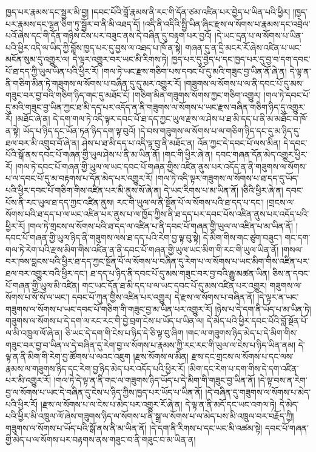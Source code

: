 ཁྱད་པར་རྣམས་དང་སྦྱར་མི་བྱ། །དབང་པོའི་བློ་རྣམས་ནི་རང་གི་དོན་ཙམ་འཛིན་པར་བྱེད་པ་ཡིན་པའི་ཕྱིར། །ཁྱད་པར་རྣམས་དང་ལྷན་ཅིག་ཏུ་སྦྱོར་བ་ནི་མི་འཐད་དོ། །འདི་ནི་འདིའི་སྤྱི་ཡིན་ཞིང་རྫས་ལ་སོགས་པ་རྣམས་དང་འབྲེལ་པའོ་ཞེས་དང་གི་དོན་གཉིས་ངེས་པར་བཟུང་ནས་དེ་བཞིན་དུ་བརྟག་པར་བྱའོ། །དེ་ཡང་དྲན་པ་ལ་སོགས་པ་ཡིན་པའི་ཕྱིར་འདི་ལ་ཡིད་ཀྱི་བློས་ཁྱད་པར་དུ་བྱས་ལ་འཐད་པ་ཁོ་ན་སྟེ། གཞན་དུ་ན་དྲི་མངར་རོ་ཞེས་འཛིན་པ་ཡང་མངོན་སུམ་དུ་འགྱུར་ལ། དེ་ལྟར་འགྱུར་བར་ཡང་མི་རིགས་ཏེ། ཁྱད་པར་དུ་བྱེད་པ་དང་ཁྱད་པར་དུ་བྱ་བ་དག་དབང་པོ་ཐ་དད་ཀྱི་ཡུལ་ཡིན་པའི་ཕྱིར་རོ། །གལ་ཏེ་ཡང་རྫས་གཅིག་པས་དབང་པོ་དུ་མའི་གཟུང་བྱ་ཡིན་ནོ་ཞེ་ན། དེ་ལྟ་ན་ནི་གཅིག་མིན་ཏེ་གཟུགས་ལ་སོགས་པ་བཞིན་དུ་དུ་མར་འགྱུར་རོ། །གཟུགས་ལ་སོགས་པ་ལ་ནི་དབང་པོ་དུ་མས་གཟུང་བར་བྱ་བའི་གཅིག་ཉིད་གང་དུ་མཐོང་ངོ། །གཅིག་མིན་གཟུགས་སོགས་ཀྱང་གཅིག་འགྱུར། །གལ་ཏེ་དབང་པོ་དུ་མའི་གཟུང་བྱ་ཡིན་ཀྱང་ཐ་མི་དད་པར་འདོད་ན་ནི་གཟུགས་ལ་སོགས་པ་ཡང་རྫས་བཞིན་གཅིག་ཉིད་དུ་འགྱུར་རོ། །མཐོང་ཞེ་ན། དེ་དག་གལ་ཏེ་འདི་ལྟར་དབང་པོ་ཐ་དད་ཀྱང་ཡུལ་རྫས་ལ་ཤེས་པ་ཐ་མི་དད་པ་ནི་མ་མཐོང་བ་ཁོ་ན་སྟེ། ཡོད་པ་ཉིད་དང་ཡོན་ཏན་ཉིད་དག་ལྟ་བུའོ། །དེ་བས་གཟུགས་ལ་སོགས་པ་ལ་གཅིག་ཉིད་དང་དུ་མ་ཉིད་དུ་ཐལ་བར་མི་འགྲུབ་བོ་ཞེ་ན། ཤེས་པ་ཐ་མི་དད་པ་འདི་ལྟ་བུ་ནི་མཐོང་ན། འོན་ཀྱང་དེ་དབང་པོ་ལས་མིན། དེ་དབང་པོའི་སྒོ་ནས་དབང་པོ་གཞན་གྱི་ཡུལ་ཤེས་པ་ནི་མ་ཡིན་ནོ། །གང་གི་ཕྱིར་ཞེ་ན། དབང་གཞན་དོན་མེད་འགྱུར་ཕྱིར་རོ། །གལ་ཏེ་དབང་པོ་གཞན་གྱི་ཡུལ་ལ་ཡང་དབང་པོ་གཞན་གྱིས་འཛིན་ནུས་པར་འདོད་ན་ནི་གཟུགས་ལ་སོགས་པ་ལ་དབང་པོ་དུ་མ་བརྟགས་པ་དོན་མེད་པར་འགྱུར་རོ། །གལ་ཏེ་འདི་ལྟར་གཟུགས་ལ་སོགས་པ་ཐ་དད་དུ་ཡོད་པའི་ཕྱིར་དབང་པོ་གཅིག་གིས་འཛིན་པར་མི་ནུས་སོ་ཞེ་ན། དེ་ཡང་རིགས་པ་མ་ཡིན་ནོ། །ཅིའི་ཕྱིར་ཞེ་ན། དབང་པོས་ནི་རང་ཡུལ་ཐ་དད་ཀྱང་འཛིན་ནུས། རང་གི་ཡུལ་ལ་ནི་སྔོན་པོ་ལ་སོགས་པའི་ཐ་དད་པ་དང་། །གྲངས་ལ་སོགས་པའི་ཐ་དད་པ་ལ་ཡང་འཛིན་པར་ནུས་པ་ལ་ཁྱོད་ཀྱིས་ནི་ཐ་དད་པར་དབང་པོས་འཛིན་ནུས་པར་འདོད་པའི་ཕྱིར་རོ། །གལ་ཏེ་གྲངས་ལ་སོགས་པའི་ཐ་དད་ལ་འཛིན་པ་ནི་དབང་པོ་གཞན་གྱི་ཡུལ་ལ་འཛིན་པ་མ་ཡིན་ནོ། །དབང་པོ་གཞན་གྱི་ཡུལ་ཉིད་ནི་གཟུགས་ལས་ཐ་དད་པའི་རེག་བྱ་ལྟ་བུ་སྟེ། དེ་མིག་གིས་གང་ཙུག་བཟུང་། གང་དག་གལ་ཏེ་རེག་པའི་རྫས་མིག་གིས་འཛིན་ན་ནི་དབང་པོ་གཞན་གྱི་ཡུལ་ཡང་མིག་གི་རང་གི་ཡུལ་ཡིན་ནོ། །གསལ་བར་ཁས་བླངས་པའི་ཕྱིར་ཐ་དད་ཀྱང་སྔོན་པོ་ལ་སོགས་པ་བཞིན་དུ་རེག་པ་ལ་སོགས་པ་ཡང་མིག་གིས་འཛིན་པར་ཐལ་བར་འགྱུར་བའི་ཕྱིར་དང་། ཐ་དད་པ་ཉིད་ནི་དབང་པོ་དུ་མས་གཟུང་བར་བྱ་བའི་རྒྱུ་མཚན་ཡིན། ཅིས་ན་དབང་པོ་གཞན་གྱི་ཡུལ་མི་འཛིན། གང་ཡང་དོན་ཐ་མི་དད་པ་ལ་ཡང་དབང་པོ་དུ་མས་འཛིན་པར་འགྱུར། གཟུགས་ལ་སོགས་པ་སོ་སོ་ལ་ཡང་། དབང་པོ་ཀུན་གྱིས་འཛིན་པར་འགྱུར། དེ་རྫས་ལ་སོགས་པ་བཞིན་ནོ། །དེ་ལྟར་ན་ཡང་གཟུགས་ལ་སོགས་པ་ཡང་དབང་པོ་གཅིག་གི་གཟུང་བྱ་མ་ཡིན་པར་འགྱུར་རོ། །ཉེས་པ་དེ་དག་ནི་ཡོད་པ་མ་ཡིན་ཏེ། གཟུགས་ལ་སོགས་པ་དེ་དག་ལ་རང་རང་གི་བྱེ་བྲག་ངེས་པ་ཡོད་པ་ཡིན་ལ། དེ་མེད་པའི་ཕྱིར་དབང་པོའི་བློ་སྔོན་པོ་ལ་མི་འཁྲུལ་ལོ་ཞེ་ན། ཅི་ཡང་དེ་དག་གི་ངེས་པ་ཉིད་དེ་ཅི་ལྟ་བུ་ཞིག །གང་ལ་གཟུགས་ཉིད་མེད་པ་དེ་མིག་གིས་གཟུང་བར་བྱ་བ་ཡིན་ལ་དེ་བཞིན་དུ་རེག་བྱ་ལ་སོགས་པ་རྣམས་ཀྱི་རང་རང་གི་ཡུལ་ལ་ངེས་པ་ཉིད་ཡིན་ནམ། དེ་ལྟ་ན་ནི་མིག་གི་རེག་བྱ་ཚོགས་པ་ལའང་འཇུག །རྫས་སོགས་ལ་མིན། རྫས་དང་གྲངས་ལ་སོགས་པ་དང་ལས་རྣམས་ལ་གཟུགས་ཉིད་དང་རེག་བྱ་ཉིད་མེད་པར་འདོད་པའི་ཕྱིར་རོ། །མིག་དང་རེག་པ་དག་གིས་དེ་དག་འཛིན་པར་མི་འགྱུར་རོ། །གལ་ཏེ་དེ་ལྟ་ན་ནི་གང་ལ་གཟུགས་ཉིད་ཡོད་པ་དེ་མིག་གི་གཟུང་བྱ་ཡིན་ནོ། །དེ་ལྟ་བས་ན་རེག་བྱ་ལ་སོགས་པ་ཡང་དེ་བཞིན་དུ་ངེས་པ་ཉིད་ཀྱིས་ཁྱད་པར་ཡོད་པ་ཡིན་ནོ། །དེ་བཞིན་དུ་གཟུགས་ལ་སོགས་པ་མེད་པའི་ཕྱིར་རོ། །རྫས་ལ་སོགས་པ་ལ་ངེས་པ་མེད་པར་འགྱུར་རོ་ཞེ་ན། དེ་ལྟ་ན་ནི་མདོ་དང་ཡང་འགལ་ཏེ། དེ་མེད་པའི་ཕྱིར་མི་འཁྲུལ་ལོ་ཞེས་གཟུགས་ཉིད་ལ་སོགས་པ་ནི་སྒྲ་ལ་སོགས་པ་ལ་མེད་པས་མི་འཁྲུལ་བར་བརྗོད་ཀྱི། གཟུགས་ལ་སོགས་པ་ཡོད་པའི་སྒོ་ནས་ནི་མ་ཡིན་ནོ། །དེ་དག་ནི་རིགས་པ་དང་ཡང་མི་འཚམ་སྟེ། དབང་པོ་གཞན་གྱི་མེད་པ་ལ་སོགས་པར་བརྟགས་ནས་གཟུང་བ་ནི་གཟུང་བ་མ་ཡིན་ན། 